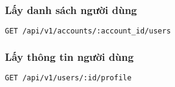\documentclass[../Thesis.tex]{subfiles}
\begin{document}
        \subsubsection{Lấy danh sách người dùng}
        \begin{lstlisting}[language=bash]
            GET /api/v1/accounts/:account_id/users
        \end{lstlisting}
        
        \subsubsection{Lấy thông tin người dùng}
        \begin{lstlisting}[language=bash]
            GET /api/v1/users/:id/profile
        \end{lstlisting}


    
\end{document}
